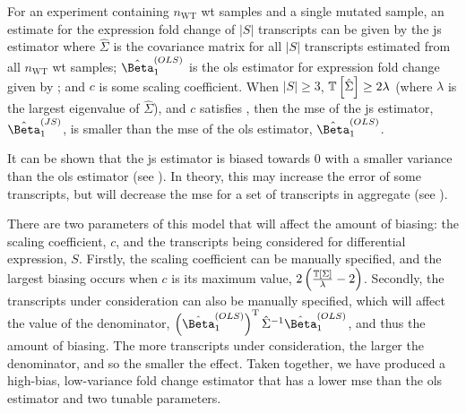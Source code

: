 \begin{theorem}
  For an experiment containing $n_\mathrm{WT}$ \gls{wt} samples and a single mutated sample, an estimate for the expression fold change of $|S|$ transcripts can be given by the \gls{js} estimator  where $\hat{\Sigma}$ is the covariance matrix for all $|S|$ transcripts estimated from all $n_\mathrm{WT}$ \gls{wt} samples; $\hat{\Beta}_1^{(OLS)}$ is the \gls{ols} estimator for expression fold change given by ; and $c$ is some scaling coefficient.
  When $|S| \ge 3$, $\mathbb{T} \left[ \hat{\Sigma} \right] \ge 2\lambda$ (where $\lambda$ is the largest eigenvalue of $\hat{\Sigma}$), and $c$ satisfies , then the \gls{mse} of the \gls{js} estimator, $\hat{\Beta}_1^{(JS)}$, is smaller than the \gls{mse} of the \gls{ols} estimator, $\hat{\Beta}_1^{(OLS)}$.
\end{theorem}

It can be shown that the \gls{js} estimator is biased towards 0 with a smaller variance than the \gls{ols} estimator (see ).
In theory, this may increase the error of some transcripts, but will decrease the \gls{mse} for a set of transcripts in aggregate (see ).

There are two parameters of this model that will affect the amount of biasing: the scaling coefficient, $c$, and the transcripts being considered for differential expression, $S$.
Firstly, the scaling coefficient can be manually specified, and the largest biasing occurs when $c$ is its maximum value, $2 \left( \frac{\mathbb{T} \left[ \Sigma \right]}{\lambda} - 2 \right)$.
Secondly, the transcripts under consideration can also be manually specified, which will affect the value of the denominator, $\left( \hat{\Beta}_1^{(OLS)} \right)^\tran \hat{\Sigma}^{-1} \hat{\Beta}_1^{(OLS)}$, and thus the amount of biasing.
The more transcripts under consideration, the larger the denominator, and so the smaller the effect.
Taken together, we have produced a high-bias, low-variance fold change estimator that has a lower \gls{mse} than the \gls{ols} estimator and two tunable parameters.
